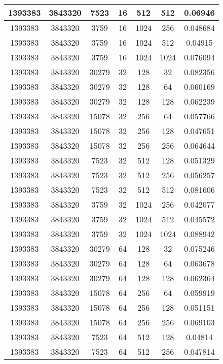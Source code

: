 \documentclass[9pt]{article}
\begin{document}
\begin{tabular}{|c|c|c|c|c|c|c| }
\hline
1393383  & 3843320  & 7523  & 16  & 512  & 512  & 0.06946 \\
\hline
1393383  & 3843320  & 3759  & 16  & 1024  & 256  & 0.048684 \\
\hline
1393383  & 3843320  & 3759  & 16  & 1024  & 512  & 0.04915 \\
\hline
1393383  & 3843320  & 3759  & 16  & 1024  & 1024  & 0.076094 \\
\hline
1393383  & 3843320  & 30279  & 32  & 128  & 32  & 0.082356 \\
\hline
1393383  & 3843320  & 30279  & 32  & 128  & 64  & 0.060169 \\
\hline
1393383  & 3843320  & 30279  & 32  & 128  & 128  & 0.062239 \\
\hline
1393383  & 3843320  & 15078  & 32  & 256  & 64  & 0.057766 \\
\hline
1393383  & 3843320  & 15078  & 32  & 256  & 128  & 0.047651 \\
\hline
1393383  & 3843320  & 15078  & 32  & 256  & 256  & 0.064644 \\
\hline
1393383  & 3843320  & 7523  & 32  & 512  & 128  & 0.051329 \\
\hline
1393383  & 3843320  & 7523  & 32  & 512  & 256  & 0.056257 \\
\hline
1393383  & 3843320  & 7523  & 32  & 512  & 512  & 0.081606 \\
\hline
1393383  & 3843320  & 3759  & 32  & 1024  & 256  & 0.042077 \\
\hline
1393383  & 3843320  & 3759  & 32  & 1024  & 512  & 0.045572 \\
\hline
1393383  & 3843320  & 3759  & 32  & 1024  & 1024  & 0.088942 \\
\hline
1393383  & 3843320  & 30279  & 64  & 128  & 32  & 0.075246 \\
\hline
1393383  & 3843320  & 30279  & 64  & 128  & 64  & 0.063678 \\
\hline
1393383  & 3843320  & 30279  & 64  & 128  & 128  & 0.062364 \\
\hline
1393383  & 3843320  & 15078  & 64  & 256  & 64  & 0.059919 \\
\hline
1393383  & 3843320  & 15078  & 64  & 256  & 128  & 0.051151 \\
\hline
1393383  & 3843320  & 15078  & 64  & 256  & 256  & 0.069103 \\
\hline
1393383  & 3843320  & 7523  & 64  & 512  & 128  & 0.04814 \\
\hline
1393383  & 3843320  & 7523  & 64  & 512  & 256  & 0.047814 \\

\end{tabular}
\end{document}
